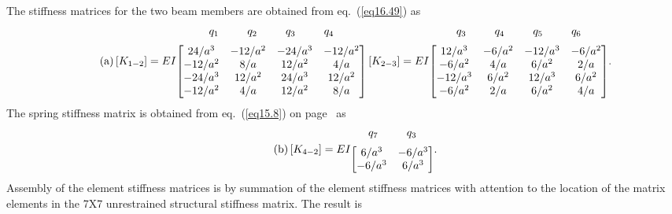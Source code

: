 \documentclass{AeroStructure-ERJohnson}
\begin{document}
\begin{example*}
The stiffness matrices for the two beam members are obtained from eq.~(\ref{eq16.49}) as
\begin{align}\label{eq16.7a}\tag{a}
\left[K_{1-2}\right]=E I
\begin{array}{@{}c@{}}
{\arraycolsep=13pt\begin{array}{@{}cccc@{}}
q_1 & q_2 & q_3 & q_4
\end{array}}\\[6pt]
\left[\begin{array}{@{}cccc@{}}24 / a^{3} & -12 / a^{2} & -24 / a^{3} & -12 / a^{2} \\-12 / a^{2} & 8 / a & 12 / a^{2} & 4 / a \\-24 / a^{3} & 12 / a^{2} & 24 / a^{3} & 12 / a^{2} \\-12 / a^{2} & 4 / a & 12 / a^{2} & 8 / a\end{array}\right]
\end{array}
\left[K_{2-3}\right]=E I
\begin{array}{@{}c@{}}
{\arraycolsep=13pt\begin{array}{@{}cccc@{}}
q_3 & q_4 & q_5 & q_6
\end{array}}\\[6pt]
\left[\begin{array}{@{}cccc@{}}12 / a^{3} & -6 / a^{2} & -12 / a^{3} & -6 / a^{2} \\-6 / a^{2} & 4 / a & 6 / a^{2} & 2 / a \\-12 / a^{3} & 6 / a^{2} & 12 / a^{3} & 6 / a^{2} \\-6 / a^{2} & 2 / a & 6 / a^{2} & 4 / a\end{array}\right]
\end{array}.
\end{align}
The spring stiffness matrix is obtained from eq.~(\ref{eq15.8}) on page~\pageref{eq15.8} as
\begin{align}\label{eq16.7b}\tag{b}
\left[K_{4-2}\right]=E I
\begin{array}{@{}c@{}}
{\arraycolsep=13pt\begin{array}{@{}cc@{}}
q_7 & q_3
\end{array}}\\[6pt]
\left[\begin{array}{@{}cc@{}}6 / a^{3} & -6 / a^{3} \\-6 / a^{3} & 6 / a^{3}\end{array}\right]
\end{array}.
\end{align}
Assembly of the element stiffness matrices is by summation of the element stiffness matrices with attention to the location of the matrix elements in the 7X7 unrestrained structural stiffness matrix. The result is

\end{example*}
\end{document}
